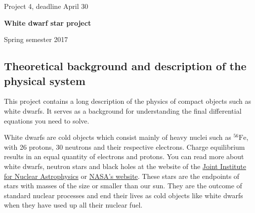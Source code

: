 \documentclass[%
oneside,                 %
final,                   %
10pt]{article}
\begin{document}

\newcommand{\exercisesection}[1]{\subsection*{#1}}






\thispagestyle{empty}

\begin{center}
{\LARGE\bf
\begin{spacing}{1.25}
Project 4, deadline  April 30
\end{spacing}
}
\end{center}


\begin{center}
{\bf White dwarf star  project${}^{}$} \\ [0mm]
\end{center}

\begin{center}
\end{center}
    

\begin{center}
Spring semester 2017
\end{center}

\vspace{1cm}


\subsection{Theoretical background and description of the physical system}

This project contains a long description of the physics of compact objects such as white dwarfs.
It serves as a background for understanding the final differential equations you need to solve.

White dwarfs are cold objects which consist mainly of heavy nuclei such as $^{56}\mbox{Fe}$, with 26 protons, 30 neutrons
and  their respective electrons.  Charge equilibrium results in an equal quantity of electrons and protons.
You can read more about white dwarfs, neutron stars and black holes at the website of the
\href{{http://www.jinaweb.org}}{Joint Institute for Nuclear Astrophysics} or \href{{http://www.nasa.org}}{NASA's website}.
These stars are the endpoints of stars with masses of the size or smaller than our sun. 
They are the outcome of standard nuclear processes and end their lives as 
cold objects like white dwarfs when they have used up all their nuclear fuel.
\end{document}

